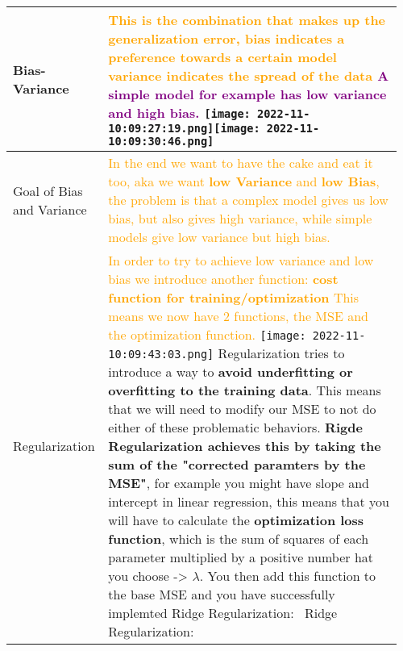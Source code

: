 \documentclass[main.tex,fontsize=8pt,paper=a4,paper=portrait,DIV=calc,]{scrartcl}
\begin{document}
\begin{table}[ht!]
\begin{tabular}{|m{0.2\linewidth}|m{0.755\linewidth}|}
\hline
Bias-Variance & 
\textcolor{orange}{This is the combination that makes up the generalization error, \newline
\textbf{bias indicates a preference towards a certain model}\newline
\textbf{variance indicates the spread of the data}}\newline
\textcolor{purple}{\textbf{A simple model for example has low variance and high bias.}}\newline
\texttt{[image: 2022-11-10:09:27:19.png]}\texttt{[image: 2022-11-10:09:30:46.png]}\\
\hline
Goal of Bias and Variance & 
\textcolor{orange}{In the end we want to have the cake and eat it too, aka we want \textbf{low Variance} and \textbf{low Bias}, \newline
the problem is that a complex model gives us low bias, but also gives high variance, while simple models give low variance but high bias.}\\
\hline
Regularization & 
\textcolor{orange}{In order to try to achieve low variance and low bias we introduce another function: \textbf{cost function for training/optimization}\newline
This means we now have 2 functions, the MSE and the optimization function.}\newline
\texttt{[image: 2022-11-10:09:43:03.png]}\newline
Regularization tries to introduce a way to \textbf{avoid underfitting or overfitting to the training data}. \newline
This means that we will need to modify our MSE to not do either of these problematic behaviors.\newline
\textbf{Rigde Regularization achieves this by taking the sum of the "corrected paramters by the MSE"}, for example you might have slope and intercept in linear regression, this means that you will have to calculate the \textbf{optimization loss function}, which is the sum of squares of each parameter multiplied by a positive number hat you choose -> \(\lambda\). \newline You then add this function to the base MSE and you have successfully implemted Ridge Regularization:\newline
\, \newline
\textcolor{OliveGreen}{Ridge Regularization:}\newline

\end{tabular}
\end{table}
\end{document}
